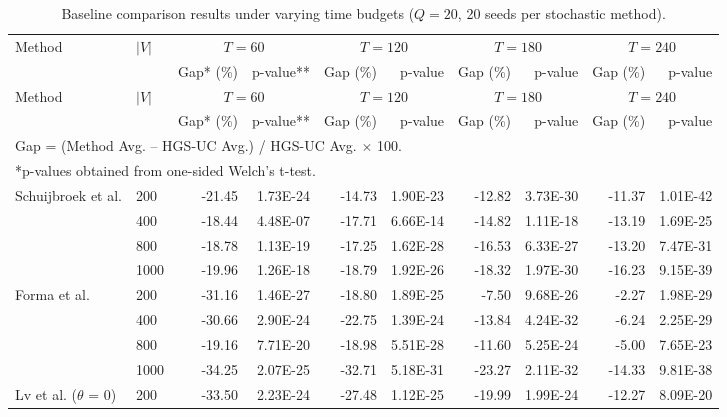 \documentclass[11pt]{article}
\numberwithin{table}{section}
\numberwithin{figure}{section}
\begin{document}
\begin{landscape}
\begin{longtable}{p{4.2cm}lrrrrrrrr}
\caption{Baseline comparison results under varying time budgets ($Q=20$, 20 seeds per stochastic method).}\label{tab:baseline-time}\\
\toprule
\multirow{2}{*}{Method} & \multirow{2}{*}{$|V|$} & \multicolumn{2}{c}{$T=60$} & \multicolumn{2}{c}{$T=120$} & \multicolumn{2}{c}{$T=180$} & \multicolumn{2}{c}{$T=240$} \\
\cmidrule(lr){3-4}\cmidrule(lr){5-6}\cmidrule(lr){7-8}\cmidrule(lr){9-10}
& & Gap* (\%) & p-value** & Gap (\%) & p-value & Gap (\%) & p-value & Gap (\%) & p-value \\
\midrule
\endfirsthead
\toprule
\multirow{2}{*}{Method} & \multirow{2}{*}{$|V|$} & \multicolumn{2}{c}{$T=60$} & \multicolumn{2}{c}{$T=120$} & \multicolumn{2}{c}{$T=180$} & \multicolumn{2}{c}{$T=240$} \\
\cmidrule(lr){3-4}\cmidrule(lr){5-6}\cmidrule(lr){7-8}\cmidrule(lr){9-10}
& & Gap* (\%) & p-value** & Gap (\%) & p-value & Gap (\%) & p-value & Gap (\%) & p-value \\
\midrule
\endhead
\bottomrule
\multicolumn{10}{l}{\footnotesize *Gap = (Method Avg. -- HGS-UC Avg.) / HGS-UC Avg. $\times$ 100.}\\
\multicolumn{10}{l}{\footnotesize **p-values obtained from one-sided Welch's t-test.}\\
\endfoot
Schuijbroek et al. & 200 & -21.45 & 1.73E-24 & -14.73 & 1.90E-23 & -12.82 & 3.73E-30 & -11.37 & 1.01E-42 \\
 & 400 & -18.44 & 4.48E-07 & -17.71 & 6.66E-14 & -14.82 & 1.11E-18 & -13.19 & 1.69E-25 \\
 & 800 & -18.78 & 1.13E-19 & -17.25 & 1.62E-28 & -16.53 & 6.33E-27 & -13.20 & 7.47E-31 \\
 & 1000 & -19.96 & 1.26E-18 & -18.79 & 1.92E-26 & -18.32 & 1.97E-30 & -16.23 & 9.15E-39 \\
\midrule
Forma et al. & 200 & -31.16 & 1.46E-27 & -18.80 & 1.89E-25 & -7.50 & 9.68E-26 & -2.27 & 1.98E-29 \\
 & 400 & -30.66 & 2.90E-24 & -22.75 & 1.39E-24 & -13.84 & 4.24E-32 & -6.24 & 2.25E-29 \\
 & 800 & -19.16 & 7.71E-20 & -18.98 & 5.51E-28 & -11.60 & 5.25E-24 & -5.00 & 7.65E-23 \\
 & 1000 & -34.25 & 2.07E-25 & -32.71 & 5.18E-31 & -23.27 & 2.11E-32 & -14.33 & 9.81E-38 \\
\midrule
Lv et al. ($\theta$ = 0) & 200 & -33.50 & 2.23E-24 & -27.48 & 1.12E-25 & -19.99 & 1.99E-24 & -12.27 & 8.09E-20 \\

\end{longtable}
\end{landscape}
\end{document}
